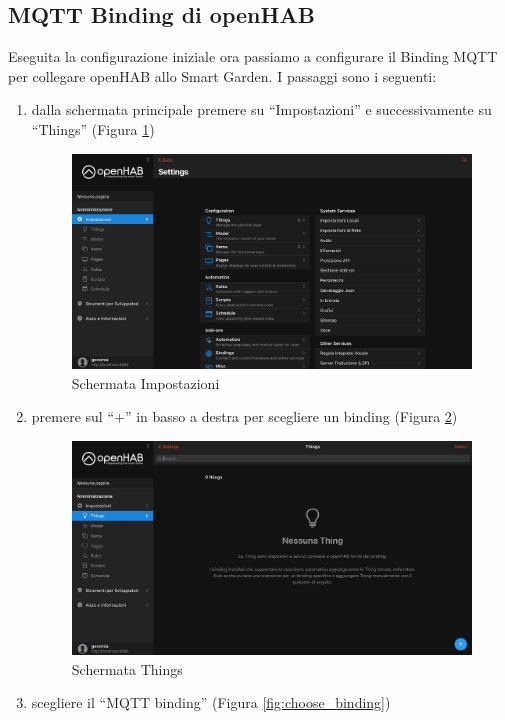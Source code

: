 \subsection{MQTT Binding di openHAB}
Eseguita la configurazione iniziale ora passiamo a configurare il Binding MQTT per collegare openHAB allo Smart Garden. I passaggi sono i seguenti:
\begin{enumerate}
    \item dalla schermata principale premere su ``Impostazioni'' e successivamente su ``Things'' (Figura \ref{fig:schermata_impostazioni})
    \begin{figure}
        \centering
        \includegraphics[width=12cm]{Immagini/schermata_impostazioni}
        \caption{Schermata Impostazioni}
        \label{fig:schermata_impostazioni}
    \end{figure}
    \item \label{enum:plus} premere sul ``+'' in basso a destra per scegliere un binding (Figura \ref{fig:schermata_things})
    \begin{figure}
        \centering
        \includegraphics[width=12cm]{Immagini/schermata_things}
        \caption{Schermata Things}
        \label{fig:schermata_things}
    \end{figure}
    \item \label{enum:mqtt_binding}  scegliere il ``MQTT binding'' (Figura \ref{fig:choose_binding})

\end{enumerate}
